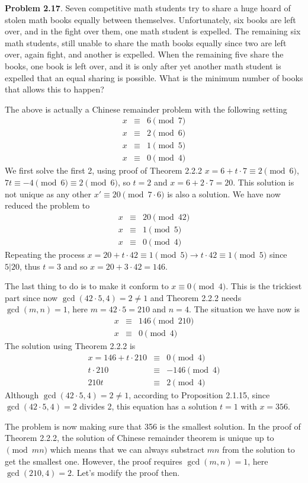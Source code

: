 \documentclass[aps,preprint,preprintnumbers,nofootinbib,showpacs,prd]{revtex4-1}
\newcommand{\nbea}{\begin{eqnarray*}}
\newcommand{\neea}{\end{eqnarray*}}
\begin{document}
{\bf Problem 2.17}. Seven competitive math students try to share a huge hoard of stolen math books equally between themselves. Unfortunately, six books are left over, and in the fight over them, one math student is expelled. The remaining six math students, still unable to share the math books equally since two are left over, again fight, and another is expelled.
When the remaining five share the books, one book is left over, and it is only after yet another math student is expelled that an equal sharing is possible. What is the minimum number of books that allows this to happen?

The above is actually a Chinese remainder problem with the following setting
%
\nbea
x & \equiv & 6 \pmod{7} \\
x & \equiv & 2 \pmod{6} \\
x & \equiv & 1 \pmod{5} \\
x & \equiv & 0 \pmod{4}
\neea
%
We first solve the first 2, using proof of Theorem 2.2.2 $x = 6 + t\cdot 7 \equiv 2 \pmod {6}$, $7t \equiv -4 \pmod{6} \equiv 2 \pmod{6}$, so $t=2$ and $x = 6 + 2 \cdot 7 = 20$. This solution is not unique as any other $x' \equiv 20 \pmod{7\cdot 6}$ is also a solution. We have now reduced the problem to
%
\nbea
x & \equiv & 20 \pmod{42} \\
x & \equiv & 1 \pmod{5} \\
x & \equiv & 0 \pmod{4}
\neea
%
Repeating the process $x = 20 + t\cdot 42 \equiv 1 \pmod{5} \to t\cdot 42 \equiv 1 \pmod{5}$ since $5|20$, thus $t = 3$ and so $x = 20 + 3 \cdot 42 = 146$.

The last thing to do is to make it conform to $x \equiv 0 \pmod{4}$. This is the trickiest part since now $\gcd(42\cdot 5, 4) = 2 \neq 1$ and Theorem 2.2.2 needs $\gcd(m,n) = 1$, here $m = 42 \cdot 5 = 210$ and $n=4$. The situation we have now is
%
\nbea
x & \equiv & 146 \pmod{210} \\
x & \equiv & 0 \pmod{4}
\neea
%
The solution using Theorem 2.2.2 is
%
\nbea
x = 146 + t\cdot 210 & \equiv & 0 \pmod {4} \\
t\cdot 210 & \equiv & -146 \pmod {4} \\
210 t & \equiv & 2 \pmod {4}
\neea
%
Although $\gcd(42\cdot 5, 4) = 2 \neq 1$, according to Proposition 2.1.15, since $\gcd(42\cdot 5, 4) = 2$ divides 2, this equation has a solution $t=1$ with $x = 356$. 

The problem is now making sure that 356 is the smallest solution. In the proof of Theorem 2.2.2, the solution of Chinese remainder theorem is unique up to $\pmod{mn}$ which means that we can always substract $mn$ from the solution to get the smallest one. However, the proof requires $\gcd(m,n)=1$, here $\gcd(210, 4) = 2$. Let's modify the proof then.
\end{document}
